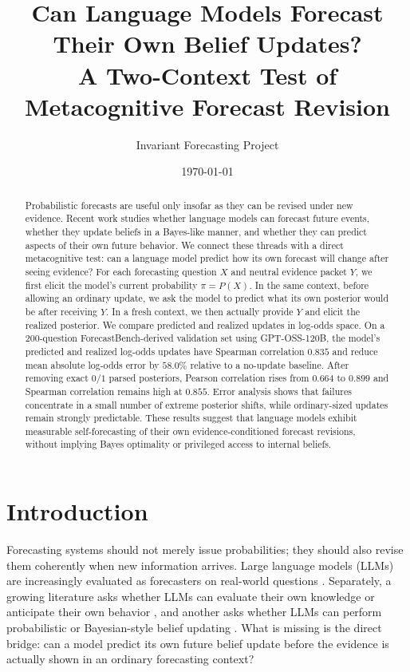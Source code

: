 \documentclass[11pt]{article}
\title{Can Language Models Forecast Their Own Belief Updates?\\
\large A Two-Context Test of Metacognitive Forecast Revision}
\author{Invariant Forecasting Project}
\date{\today}
\begin{document}
\maketitle

\begin{abstract}
Probabilistic forecasts are useful only insofar as they can be revised under
new evidence. Recent work studies whether language models can forecast future
events, whether they update beliefs in a Bayes-like manner, and whether they
can predict aspects of their own future behavior. We connect these threads with
a direct metacognitive test: can a language model predict how its own forecast
will change after seeing evidence? For each forecasting question $X$ and
neutral evidence packet $Y$, we first elicit the model's current probability
$\pi=P(X)$. In the same context, before allowing an ordinary update, we ask the
model to predict what its own posterior would be after receiving $Y$. In a
fresh context, we then actually provide $Y$ and elicit the realized posterior.
We compare predicted and realized updates in log-odds space. On a 200-question
ForecastBench-derived validation set using GPT-OSS-120B, the model's predicted
and realized log-odds updates have Spearman correlation $0.835$ and reduce
mean absolute log-odds error by $58.0\%$ relative to a no-update baseline.
After removing exact $0/1$ parsed posteriors, Pearson correlation rises from
$0.664$ to $0.899$ and Spearman correlation remains high at $0.855$. Error
analysis shows that failures concentrate in a small number of extreme posterior
shifts, while ordinary-sized updates remain strongly predictable. These results
suggest that language models exhibit measurable self-forecasting of their own
evidence-conditioned forecast revisions, without implying Bayes optimality or
privileged access to internal beliefs.
\end{abstract}

\section{Introduction}

Forecasting systems should not merely issue probabilities; they should also
revise them coherently when new information arrives. Large language models
(LLMs) are increasingly evaluated as forecasters on real-world questions
\cite{halawi2024forecasting,karger2024forecastbench}. Separately, a growing
literature asks whether LLMs can evaluate their own knowledge or anticipate
their own behavior \cite{kadavath2022know,ashok2025behavior,binder2024inward},
and another asks whether LLMs can perform probabilistic or Bayesian-style
belief updating \cite{qiu2026bayesian}. What is missing is the direct bridge:
can a model predict its own future belief update before the evidence is
actually shown in an ordinary forecasting context?
\end{document}

